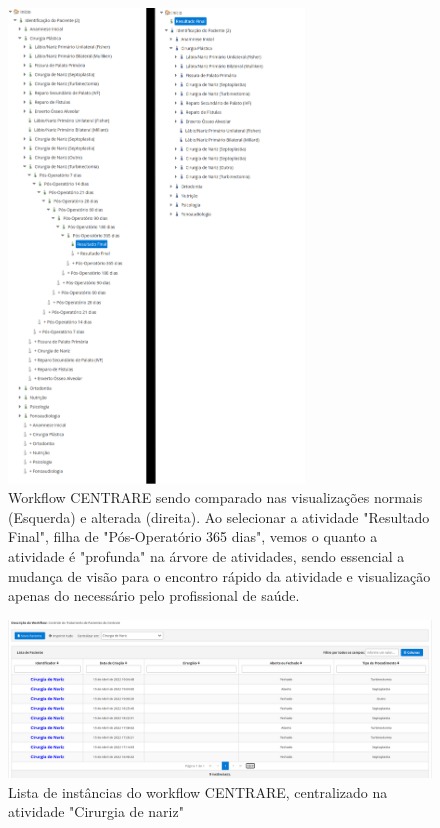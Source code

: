 \begin{figure}
    \centering
    \includegraphics[width=0.7\textwidth]{imgs/CENTRARE/arvoreNormalEAlterada.png}
    \caption{Workflow CENTRARE sendo comparado nas visualizações normais (Esquerda) e alterada (direita). Ao selecionar a atividade "Resultado Final", filha de "Pós-Operatório 365 dias", vemos o quanto a atividade é "profunda" na árvore de atividades, sendo essencial a mudança de visão para o encontro rápido da atividade e visualização apenas do necessário pelo profissional de saúde. }
    \label{fig:changedWorkflow}
\end{figure}

\begin{figure}
    \centering
    \includegraphics[width=1\textwidth]{imgs/CENTRARE/instanciaAlterada.png}
    \caption{Lista de instâncias do workflow CENTRARE, centralizado na atividade "Cirurgia de nariz"}
    \label{fig:changedInstance}
\end{figure}

